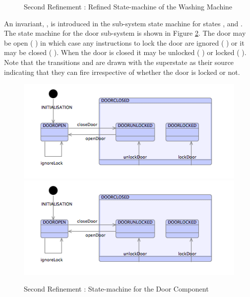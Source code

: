 \begin{figure}[!htbp]
  \fi
  \caption{Second Refinement : Refined State-machine of the Washing Machine}
  \label{fig:SecondRefinementRefinedStatemachineOfTheWashingMachine}
\end{figure} 

An invariant,  , is introduced in the sub-system state machine for states  ,   and  .
The state machine for the door sub-system is shown in Figure \ref{fig:SecondRefinementStatemachineForTheDoorComponent}. The door may be open ( ) in which case any instructions to lock the door are ignored ( ) or it may be closed ( ). When the door is closed it may be unlocked ( ) or locked ( ). Note that the transitions   and   are drawn with the superstate   as their source indicating that they can fire irrespective of whether the door is locked or not.
 
 \begin{figure}[!htbp]
 \centering
      \ifplastex
      \includegraphics[width=1024]{figures/image27.png}
      \else
      \includegraphics[width=1\textwidth]{figures/image27.png}
      \fi
  \caption{Second Refinement : State-machine for the Door Component}
  \label{fig:SecondRefinementStatemachineForTheDoorComponent}
\end{figure} 

